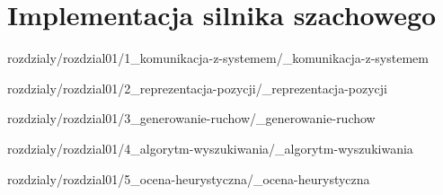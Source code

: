 \chapter {Implementacja silnika szachowego}
\label {ch: implementacja-silnika-szachowego}

 {rozdzialy/rozdzial01/1_komunikacja-z-systemem/_komunikacja-z-systemem}

 {rozdzialy/rozdzial01/2_reprezentacja-pozycji/_reprezentacja-pozycji}

 {rozdzialy/rozdzial01/3_generowanie-ruchow/_generowanie-ruchow}

 {rozdzialy/rozdzial01/4_algorytm-wyszukiwania/_algorytm-wyszukiwania}

 {rozdzialy/rozdzial01/5_ocena-heurystyczna/_ocena-heurystyczna}

